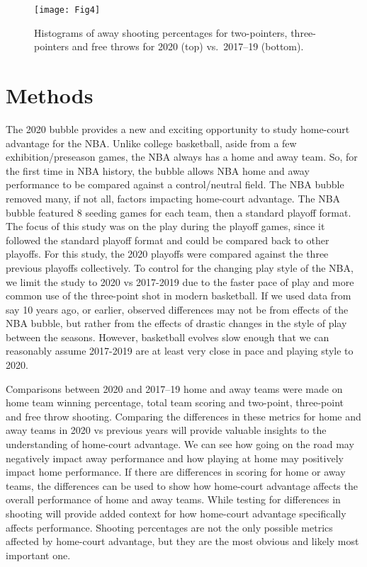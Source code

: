 \documentclass[10pt]{article}
\begin{document}
\begin{figure}[H]
  \centering
  \texttt{[image: Fig4]}
  \caption{Histograms of away shooting percentages for two-pointers,
    three-pointers and free throws for 2020 (top) vs.~2017--19
    (bottom).}
  \label{fig:Fig4}  
\end{figure}

\section{Methods}

The 2020 bubble provides a new and exciting opportunity to study home-court
advantage for the NBA. Unlike college basketball, aside from a few
exhibition/preseason games, the NBA always has a home and away team. So, for
the first time in NBA history, the bubble allows NBA home and away performance
to be compared against a control/neutral field. The NBA bubble
removed many, if not all, factors impacting home-court advantage. The NBA 
bubble featured 8 seeding games for each team, then a
standard playoff format. The focus of this study was on the play during the playoff
games, since it followed the standard playoff format and could be compared
back to other playoffs. For this study, the 2020 playoffs were compared against
the three previous playoffs collectively. To control
for the changing play style of the NBA, we limit the study to 2020 vs 2017-2019
due to the faster pace of play and more common use of the three-point shot
in modern basketball. If we used data from say 10 years ago, or earlier, observed
differences may not be from effects of the NBA bubble, but rather from the effects
of drastic changes in the style of play between the seasons. However, basketball
evolves slow enough that we can reasonably assume 2017-2019 are at least very
close in pace and playing style to 2020.

Comparisons between 2020 and 2017--19 home and away teams were made on home team
winning percentage, total team scoring and two-point, three-point and free throw
shooting. Comparing the differences in these metrics for home and away teams in
2020 vs previous years will provide valuable insights to the understanding of
home-court advantage. We can see how going on the road may negatively impact
away performance and how playing at home may positively impact home performance.
If there are differences in scoring for home or away teams, the differences can
be used to show how home-court advantage affects the overall performance of home
and away teams. While testing for differences in shooting will provide added
context for how home-court advantage specifically affects performance.
Shooting percentages are not the only possible metrics affected by home-court
advantage, but they are the most obvious and likely most important one.
\end{document}
